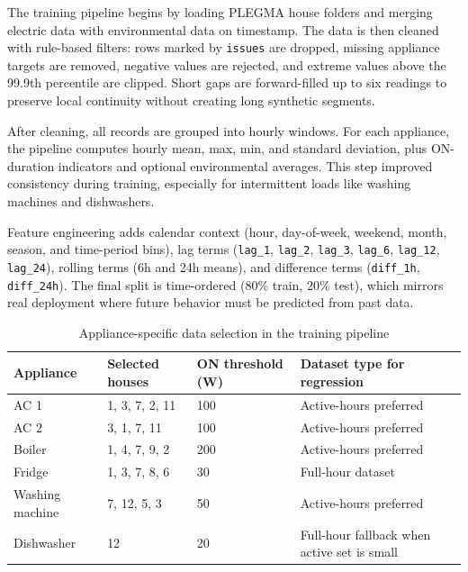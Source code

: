 \documentclass[12pt, a4paper]{article}
\numberwithin{figure}{section}
\numberwithin{table}{section}
\begin{document}
	The training pipeline begins by loading PLEGMA house folders and merging electric data with environmental data on timestamp. The data is then cleaned with rule-based filters: rows marked by \texttt{issues} are dropped, missing appliance targets are removed, negative values are rejected, and extreme values above the 99.9th percentile are clipped. Short gaps are forward-filled up to six readings to preserve local continuity without creating long synthetic segments.
	
	After cleaning, all records are grouped into hourly windows. For each appliance, the pipeline computes hourly mean, max, min, and standard deviation, plus ON-duration indicators and optional environmental averages. This step improved consistency during training, especially for intermittent loads like washing machines and dishwashers.
	
	Feature engineering adds calendar context (hour, day-of-week, weekend, month, season, and time-period bins), lag terms (\texttt{lag\_1}, \texttt{lag\_2}, \texttt{lag\_3}, \texttt{lag\_6}, \texttt{lag\_12}, \texttt{lag\_24}), rolling terms (6h and 24h means), and difference terms (\texttt{diff\_1h}, \texttt{diff\_24h}). The final split is time-ordered (80\% train, 20\% test), which mirrors real deployment where future behavior must be predicted from past data.
	
	\begin{table}[H]
		\centering
		\caption{Appliance-specific data selection in the training pipeline}
		\label{tab:quality-houses}
		\vspace{6pt}
	\small
	\setlength{\tabcolsep}{4pt}
	\begin{tabularx}{\textwidth}{|p{1.8cm}|p{3.3cm}|p{1.9cm}|X|}
			\hline
			\textbf{Appliance} & \textbf{Selected houses} & \textbf{ON threshold (W)} & \textbf{Dataset type for regression} \\
			\hline
			AC 1 & 1, 3, 7, 2, 11 & 100 & Active-hours preferred \\
			\hline
			AC 2 & 3, 1, 7, 11 & 100 & Active-hours preferred \\
			\hline
			Boiler & 1, 4, 7, 9, 2 & 200 & Active-hours preferred \\
			\hline
			Fridge & 1, 3, 7, 8, 6 & 30 & Full-hour dataset \\
			\hline
			Washing machine & 7, 12, 5, 3 & 50 & Active-hours preferred \\
			\hline
			Dishwasher & 12 & 20 & Full-hour fallback when active set is small \\
			\hline
		\end{tabularx}
		\setlength{\tabcolsep}{6pt}
		\normalsize
	\end{table}
	
\end{document}
